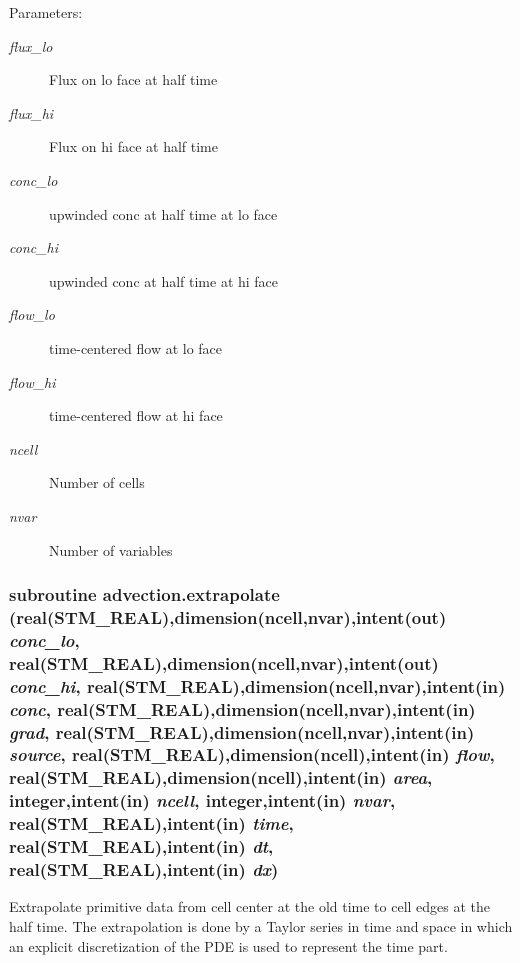 \begin{Desc}
\item[Parameters:]
\begin{description}
\item[{\em flux\_\-lo}]Flux on lo face at half time\item[{\em flux\_\-hi}]Flux on hi face at half time\item[{\em conc\_\-lo}]upwinded conc at half time at lo face\item[{\em conc\_\-hi}]upwinded conc at half time at hi face\item[{\em flow\_\-lo}]time-centered flow at lo face\item[{\em flow\_\-hi}]time-centered flow at hi face\item[{\em ncell}]Number of cells\item[{\em nvar}]Number of variables \end{description}
\end{Desc}
\hypertarget{a00026_36ba824cb5dc6ca6127866376d2e79ec}{
\subsubsection[{extrapolate}]{\setlength{\rightskip}{0pt plus 5cm}subroutine advection.extrapolate (real(STM\_\-REAL),dimension(ncell,nvar),intent(out) {\em conc\_\-lo}, \/  real(STM\_\-REAL),dimension(ncell,nvar),intent(out) {\em conc\_\-hi}, \/  real(STM\_\-REAL),dimension(ncell,nvar),intent(in) {\em conc}, \/  real(STM\_\-REAL),dimension(ncell,nvar),intent(in) {\em grad}, \/  real(STM\_\-REAL),dimension(ncell,nvar),intent(in) {\em source}, \/  real(STM\_\-REAL),dimension(ncell),intent(in) {\em flow}, \/  real(STM\_\-REAL),dimension(ncell),intent(in) {\em area}, \/  integer,intent(in) {\em ncell}, \/  integer,intent(in) {\em nvar}, \/  real(STM\_\-REAL),intent(in) {\em time}, \/  real(STM\_\-REAL),intent(in) {\em dt}, \/  real(STM\_\-REAL),intent(in) {\em dx})}}
\label{a00026_36ba824cb5dc6ca6127866376d2e79ec}


Extrapolate primitive data from cell center at the old time to cell edges at the half time. The extrapolation is done by a Taylor series in time and space in which an explicit discretization of the PDE is used to represent the time part. 

